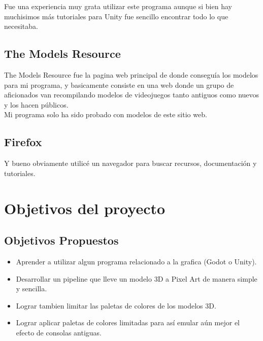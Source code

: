         Fue una experiencia muy grata utilizar este programa aunque si bien hay muchisimos más tutoriales para Unity fue sencillo encontrar todo
        lo que necesitaba.
        
\subsection{The Models Resource}
        The Models Resource fue la pagina web principal de donde conseguía los modelos para mi programa,
        y basicamente consiste en una web donde un grupo de aficionados van recompilando modelos de videojuegos
        tanto antiguos como nuevos y los hacen públicos. \\

        Mi programa solo ha sido probado con modelos de este sitio web.  

\subsection{Firefox}
        Y bueno obviamente utilicé un navegador para buscar recursos, documentación y tutoriales.

\clearpage



\section{Objetivos del proyecto}

\subsection{Objetivos Propuestos}
	\begin{itemize}
	   \item Aprender a utilizar algun programa relacionado a la grafica (Godot o Unity).
	   \item Desarrollar un pipeline que lleve un modelo 3D a Pixel Art de manera simple y sencilla.
	   \item Lograr tambien limitar las paletas de colores de los modelos 3D.
       \item Lograr aplicar paletas de colores limitadas para así emular aún mejor el efecto de consolas antiguas.
	\end{itemize}


